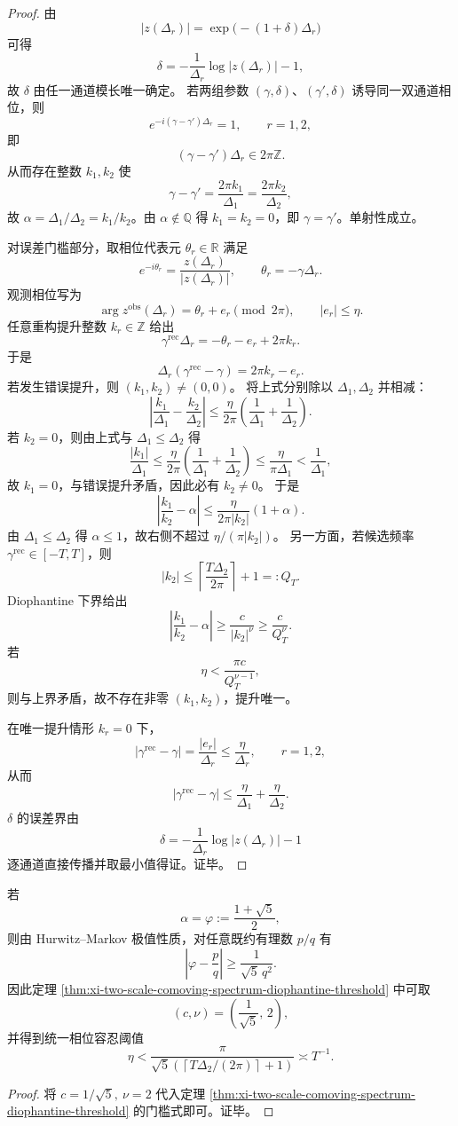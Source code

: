 \begin{proof}
由
\[
|z(\Delta_r)|=\exp\!\bigl(-(1+\delta)\Delta_r\bigr)
\]
可得
\[
\delta=-\frac{1}{\Delta_r}\log|z(\Delta_r)|-1,
\]
故 \(\delta\) 由任一通道模长唯一确定。
若两组参数 \((\gamma,\delta)\)、\((\gamma',\delta)\) 诱导同一双通道相位，则
\[
e^{-i(\gamma-\gamma')\Delta_r}=1,\qquad r=1,2,
\]
即
\[
(\gamma-\gamma')\Delta_r\in2\pi\mathbb Z.
\]
从而存在整数 \(k_1,k_2\) 使
\[
\gamma-\gamma'=\frac{2\pi k_1}{\Delta_1}=\frac{2\pi k_2}{\Delta_2},
\]
故 \(\alpha=\Delta_1/\Delta_2=k_1/k_2\)。由 \(\alpha\notin\mathbb Q\) 得 \(k_1=k_2=0\)，即 \(\gamma=\gamma'\)。单射性成立。

对误差门槛部分，取相位代表元 \(\theta_r\in\mathbb R\) 满足
\[
e^{-i\theta_r}=\frac{z(\Delta_r)}{|z(\Delta_r)|},
\qquad
\theta_r=-\gamma\Delta_r.
\]
观测相位写为
\[
\arg z^{\mathrm{obs}}(\Delta_r)=\theta_r+e_r\pmod{2\pi},
\qquad |e_r|\le\eta.
\]
任意重构提升整数 \(k_r\in\mathbb Z\) 给出
\[
\gamma^{\mathrm{rec}}\Delta_r=-\theta_r-e_r+2\pi k_r.
\]
于是
\[
\Delta_r(\gamma^{\mathrm{rec}}-\gamma)=2\pi k_r-e_r.
\]
若发生错误提升，则 \((k_1,k_2)\neq(0,0)\)。
将上式分别除以 \(\Delta_1,\Delta_2\) 并相减：
\[
\left|
\frac{k_1}{\Delta_1}-\frac{k_2}{\Delta_2}
\right|
\le
\frac{\eta}{2\pi}\left(\frac1{\Delta_1}+\frac1{\Delta_2}\right).
\]
若 \(k_2=0\)，则由上式与 \(\Delta_1\le\Delta_2\) 得
\[
\frac{|k_1|}{\Delta_1}
\le
\frac{\eta}{2\pi}\left(\frac1{\Delta_1}+\frac1{\Delta_2}\right)
\le
\frac{\eta}{\pi\Delta_1}
<
\frac1{\Delta_1},
\]
故 \(k_1=0\)，与错误提升矛盾，因此必有 \(k_2\neq0\)。
于是
\[
\left|\frac{k_1}{k_2}-\alpha\right|
\le
\frac{\eta}{2\pi|k_2|}(1+\alpha).
\]
由 \(\Delta_1\le\Delta_2\) 得 \(\alpha\le1\)，故右侧不超过 \(\eta/(\pi|k_2|)\)。
另一方面，若候选频率 \(\gamma^{\mathrm{rec}}\in[-T,T]\)，则
\[
|k_2|\le \left\lceil\frac{T\Delta_2}{2\pi}\right\rceil+1=:Q_T.
\]
Diophantine 下界给出
\[
\left|\frac{k_1}{k_2}-\alpha\right|
\ge
\frac{c}{|k_2|^\nu}
\ge
\frac{c}{Q_T^\nu}.
\]
若
\[
\eta<\frac{\pi c}{Q_T^{\nu-1}},
\]
则与上界矛盾，故不存在非零 \((k_1,k_2)\)，提升唯一。

在唯一提升情形 \(k_r=0\) 下，
\[
|\gamma^{\mathrm{rec}}-\gamma|
=\frac{|e_r|}{\Delta_r}\le\frac{\eta}{\Delta_r},\qquad r=1,2,
\]
从而
\[
|\gamma^{\mathrm{rec}}-\gamma|
\le
\frac{\eta}{\Delta_1}+\frac{\eta}{\Delta_2}.
\]
\(\delta\) 的误差界由
\[
\delta=-\frac1{\Delta_r}\log|z(\Delta_r)|-1
\]
逐通道直接传播并取最小值得证。证毕。
\end{proof}

\begin{corollary}[黄金比例步长比值的统一门槛常数]\label{cor:xi-golden-ratio-stepsize-unaliasing-threshold}
若
\[
\alpha=\varphi:=\frac{1+\sqrt5}{2},
\]
则由 Hurwitz--Markov 极值性质，对任意既约有理数 \(p/q\) 有
\[
\left|\varphi-\frac{p}{q}\right|\ge\frac{1}{\sqrt5\,q^2}.
\]
因此定理 \ref{thm:xi-two-scale-comoving-spectrum-diophantine-threshold} 中可取
\[
(c,\nu)=\left(\frac1{\sqrt5},\,2\right),
\]
并得到统一相位容忍阈值
\[
\eta<
\frac{\pi}{
\sqrt5\left(\left\lceil T\Delta_2/(2\pi)\right\rceil+1\right)
}
\asymp T^{-1}.
\]
\end{corollary}
\begin{proof}
将
\(
c=1/\sqrt5,\ \nu=2
\)
代入定理 \ref{thm:xi-two-scale-comoving-spectrum-diophantine-threshold} 的门槛式即可。证毕。
\end{proof}


